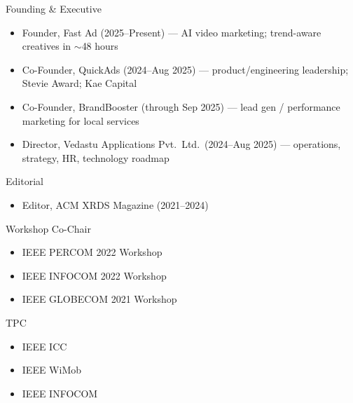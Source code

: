 \begin{experiences}
  \service
    {Founding \& Executive}{
      \begin{itemize}
        \item Founder, Fast Ad (2025--Present) --- AI video marketing; trend-aware creatives in $\sim$48 hours
        \item Co-Founder, QuickAds (2024--Aug 2025) --- product/engineering leadership; Stevie Award; Kae Capital
        \item Co-Founder, BrandBooster (through Sep 2025) --- lead gen / performance marketing for local services
        \item Director, Vedastu Applications Pvt.\ Ltd.\ (2024--Aug 2025) --- operations, strategy, HR, technology roadmap
      \end{itemize}
    }
  \emptySeparator

  \service
    {Editorial}{
      \begin{itemize}
        \item Editor, ACM XRDS Magazine (2021--2024)
      \end{itemize}
    }
  \emptySeparator

  \service
    {Workshop Co-Chair}{
      \begin{itemize}
        \item IEEE PERCOM 2022 Workshop
        \item IEEE INFOCOM 2022 Workshop
        \item IEEE GLOBECOM 2021 Workshop
      \end{itemize}
    }
  \emptySeparator

  \service
    {TPC}{
      \begin{itemize}
        \item IEEE ICC
        \item IEEE WiMob
        \item IEEE INFOCOM
      \end{itemize}
    }
\end{experiences}
